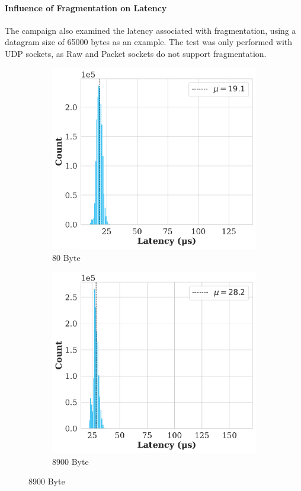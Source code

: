 \paragraph{Influence of Fragmentation on Latency}

The campaign also examined the latency associated with fragmentation, using a datagram size of 65000 bytes as an example. The test was only performed with UDP sockets, as Raw and Packet sockets do not support fragmentation.

\begin{figure}[h!]
  \centering

  \begin{subfigure}[b]{0.45\linewidth}
    \includegraphics[width=\linewidth]{figures/performance/d_4a.pdf}
    \caption{80 Byte}
    \label{fig:histFrag:a}
  \end{subfigure}
  \hfill
  \begin{subfigure}[b]{0.45\linewidth}
    \includegraphics[width=\linewidth]{figures/performance/d_4b.pdf}
    \caption{8900 Byte}
    \label{fig:histFrag:b}
  \end{subfigure}


\end{figure}
